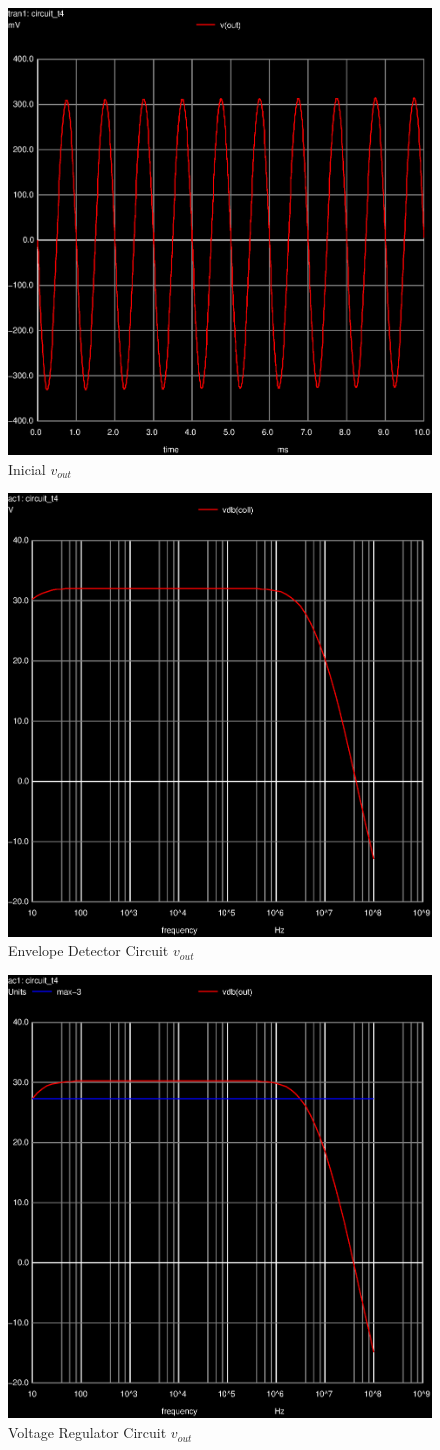 \begin{figure}[ht]
	\centering
	\includegraphics[width=0.5\linewidth]{vo1.eps}
	\caption{Inicial $v_{out}$}
\label{fig:graph_global}
\end{figure}

\begin{figure}[ht]
	\centering
	\includegraphics[width=0.6\linewidth]{vo1f.eps}
	\caption{Envelope Detector Circuit $v_{out}$}
\label{fig:EV_vout}
\end{figure}

\begin{figure}[ht]
	\centering
	\includegraphics[width=0.6\linewidth]{vo2f.eps}
	\caption{Voltage Regulator Circuit $v_{out}$}
\label{fig:VR_vout}
\end{figure}


